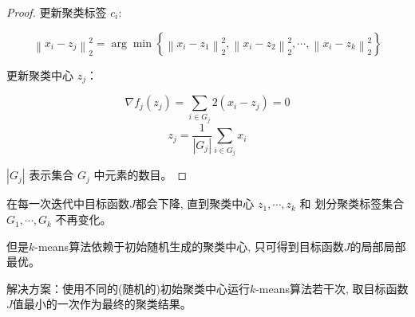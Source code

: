 \begin{proof}
    更新聚类标签 $ c_{i} $:

    $$ \left\|x_{i}-z_{j}\right\|_{2}^{2}=\arg \min \left\{\left\|x_{i}-z_{1}\right\|_{2}^{2},\left\|x_{i}-z_{2}\right\|_{2}^{2}, \cdots,\left\|x_{i}-z_{k}\right\|_{2}^{2}\right\} $$

    更新聚类中心 $ z_{j} $：

    $$ \nabla f_{j}\left(z_{j}\right)=\sum_{i \in G_{j}} 2\left(x_{i}-z_{j}\right)=0 $$
$$ z_{j}=\frac{1}{\left|G_{j}\right|} \sum_{i \in G_{j}} x_{i} $$

$ \left|G_{j}\right| $ 表示集合 $ G_{j} $ 中元素的数目。 
\end{proof}

在每一次迭代中目标函数$J$都会下降, 直到聚类中心 $ z_{1}, \cdots, z_{k} $ 和 划分聚类标签集合 $ G_{1}, \cdots, G_{k} $ 不再变化。 

但是$k$-means算法依赖于初始随机生成的聚类中心, 只可得到目标函数$J$的局部局部最优。 

解决方案：使用不同的(随机的)初始聚类中心运行$k$-means算法若干次, 取目标函数$J$值最小的一次作为最终的聚类结果。 

